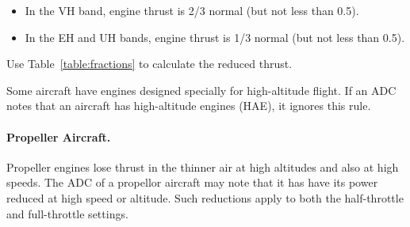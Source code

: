 \begin{advancedrules}
{\begin{itemize}
    \item In the VH band, engine thrust is 2/3 normal (but not less than 0.5).

    \item In the EH and UH bands, engine thrust is 1/3 normal (but not less than 0.5).

\end{itemize}

Use Table~\ref{table:fractions} to calculate the reduced thrust.

Some aircraft have engines designed specially for high-altitude flight. If an ADC notes that an aircraft has high-altitude engines (HAE), it ignores this rule.

\paragraph{Propeller Aircraft.} Propeller engines lose thrust in the thinner air at high altitudes and also at high speeds. The ADC of a propellor aircraft may note that it has have its power reduced at high speed or altitude. Such reductions apply to both the half-throttle and full-throttle settings.

}

\end{advancedrules}

